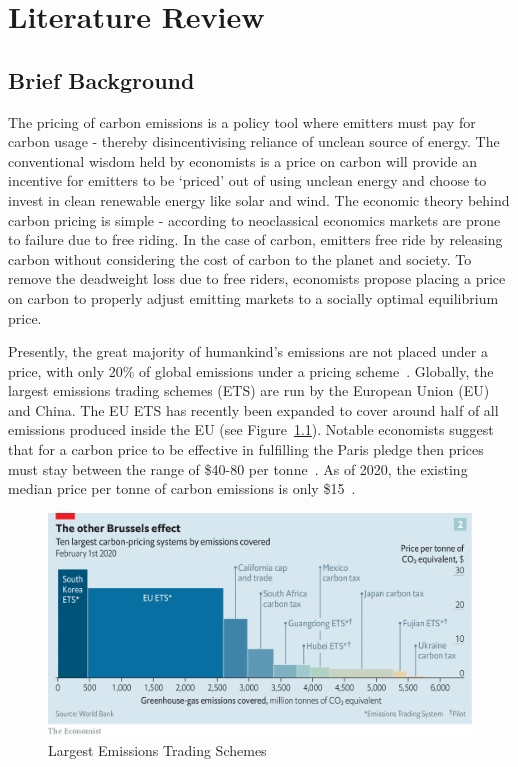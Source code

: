 \chapter{Literature Review}\label{ch:review}

\section{Brief Background}
The pricing of carbon emissions is a policy tool where emitters must pay
for carbon usage - thereby disincentivising reliance of unclean source of
energy. The conventional wisdom held by economists is a price on carbon
will provide an incentive for emitters to be `priced' out of using
unclean energy and choose to invest in clean renewable energy like
solar and wind. The economic theory behind carbon pricing is
simple - according to neoclassical economics markets are prone to
failure due to free riding. In the case of carbon, emitters free ride
by releasing carbon without considering the cost of carbon to the
planet and society. To remove the deadweight loss due to free riders, economists
propose placing a price on carbon to properly adjust emitting markets
to a socially optimal equilibrium price.

Presently, the great majority of humankind's emissions are not placed under
a price, with only 20\% of global emissions under a pricing
scheme~\cite{EconE}. Globally, the largest emissions trading schemes (ETS) are
run by the European Union (EU) and China. The EU ETS has recently been expanded
to cover around half of all emissions produced inside the EU (see
Figure~\ref{fig:ets}). Notable
economists suggest that for a carbon price to be effective in fulfilling the
Paris pledge then prices must stay between the range of \$40-80 per
tonne~\cite{EconE}.
As of 2020, the existing median price per tonne of carbon emissions is
only \$15~\cite{EconE}.

\begin{figure}[ht]
    \centering
    \includegraphics[scale=0.2]{photos/ets.png}
    \caption{Largest Emissions Trading Schemes}
    \label{fig:ets}
\end{figure}

